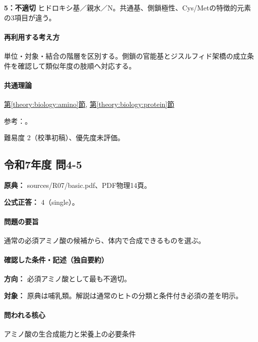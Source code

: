 \noindent\textbf{5：不適切} ヒドロキシ基／親水／N。共通基、側鎖極性、Cys/Metの特徴的元素の3項目が違う。\par

\paragraph{再利用する考え方} 単位・対象・結合の階層を区別する。側鎖の官能基とジスルフィド架橋の成立条件を確認して類似年度の肢順へ対応する。

\paragraph{共通理論} \hyperref[theory:biology:amino]{第\ref*{theory:biology:amino}節}, \hyperref[theory:biology:protein]{第\ref*{theory:biology:protein}節}

\par 参考：\cite{mit_amino,mit_protein}。

\par 難易度 2（校準初稿）、優先度未評価。

\subsection{令和7年度 問4-5}
\label{q:r07-reg-basic-4-5}

\noindent\textbf{原典：} sources/R07/basic.pdf、PDF物理14頁。

\textbf{公式正答：} 4（single）。

\paragraph{問題の要旨} 通常の必須アミノ酸の候補から、体内で合成できるものを選ぶ。

\paragraph{確認した条件・記述（独自要約）}\mbox{}\par

\noindent\textbf{方向：} 必須アミノ酸として最も不適切。\par

\noindent\textbf{対象：} 原典は哺乳類。解説は通常のヒトの分類と条件付き必須の差を明示。\par

\paragraph{問われる核心} アミノ酸の生合成能力と栄養上の必要条件

